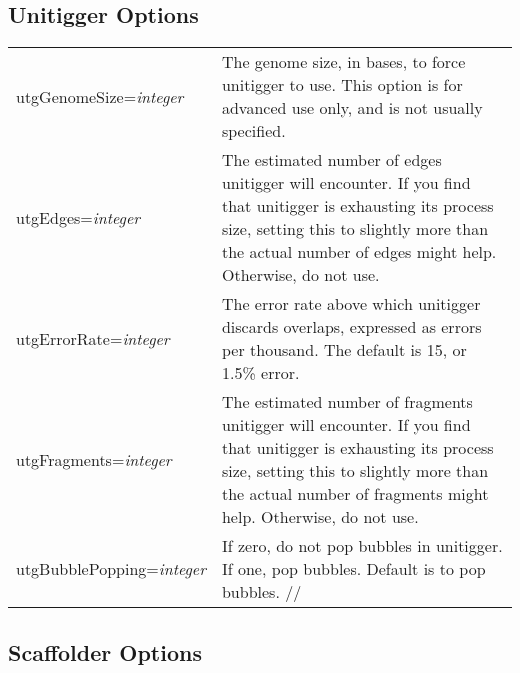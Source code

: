 \documentclass[twoside,11pt]{article}
\begin{document}
\subsection{Unitigger Options}

\begin{longtable}{lp{3.0in}}
utgGenomeSize={\it integer} &
The genome size, in bases, to force unitigger to use.  This option is
for advanced use only, and is not usually specified.
\\

utgEdges={\it integer} &
The estimated number of edges unitigger will encounter.  If you find that unitigger
is exhausting its process size, setting this to slightly more than the actual number of edges
might help.  Otherwise, do not use.
\\

utgErrorRate={\it integer} &
The error rate above which unitigger discards overlaps, expressed as errors per thousand.
The default is 15, or 1.5\% error.
\\

utgFragments={\it integer} &
The estimated number of fragments unitigger will encounter.  If you
find that unitigger is exhausting its process size, setting this to
slightly more than the actual number of fragments might help.
Otherwise, do not use.
\\

utgBubblePopping={\it integer} &
If zero, do not pop bubbles in unitigger.  If one, pop bubbles.  Default is to pop bubbles.
//
\end{longtable}



\subsection{Scaffolder Options}
\end{document}
